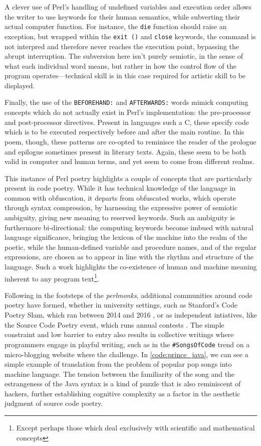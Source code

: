 A clever use of Perl's handling of undefined variables and execution order allows the writer to use keywords for their human semantics, while subverting their actual computer function. For instance, the \lstinline{die} function should raise an exception, but wrapped within the \lstinline{exit ()} and \lstinline{close} keywords, the command is not interpred and therefore never reaches the execution point, bypassing the abrupt interruption. The subversion here isn't purely semiotic, in the sense of what each individual word means, but rather in how the control flow of the program operates—technical skill is in this case required for artistic skill to be displayed.

Finally, the use of the \lstinline{BEFOREHAND:} and \lstinline{AFTERWARDS:} words mimick computing concepts which do not actually exist in Perl's implementation: the pre-processor and post-processor directives. Present in languages such a C, these specify code which is to be executed respectively before and after the main routine. In this poem, though, these patterns are co-opted to reminisce the reader of the prologue and epilogue sometimes present in literary texts. Again, these seem to be both valid in computer and human terms, and yet seem to come from different realms.

This instance of Perl poetry highlights a couple of concepts that are particularly present in code poetry. While it has technical knowledge of the language in common with obfuscation, it departs from obfuscated works, which operate through syntax compression, by harnessing the expressive power of semiotic ambiguity, giving new meaning to reserved keywords. Such an ambiguity is furthermore bi-directional: the computing keywords become imbued with natural language significance, bringing the lexicon of the machine into the realm of the poetic, while the human-defined variable and procedure names, and of the regular expressions, are chosen as to appear in line with the rhythm and structure of the language. Such a work highlights the co-existence of human and machine meaning inherent to any program text\footnote{Except perhaps those which deal exclusively with scientific and mathematical concepts}.

Following in the footsteps of the \emph{perlmonks}, additional communities around code poetry have formed, whether in university settings, such as Stanford's Code Poetry Slam, which ran between 2014 and 2016 \citep{kagen_code_2016}, or as independent intiatives, like the Source Code Poetry event, which runs annual contests \citep{unknown_source_2017}. The simple constraint and low barrier to entry also results in collective writings where programmers engage in playful writing, such as in the \lstinline{#SongsOfCode} trend on a micro-blogging website where the challenge. In \ref{code:prince_java}, we can see a simple example of translation from the problem of popular pop songs into machine language. The tension between the familiarity of the song and the estrangeness of the Java syntax is a kind of puzzle that is also reminiscent of hackers, further establishing cognitive complexity as a factor in the aesthetic judgment of source code poetry.

